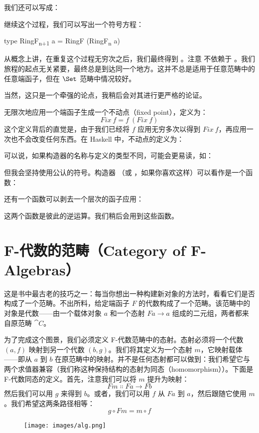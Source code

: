 我们还可以写成：

继续这个过程，我们可以写出一个符号方程：

\begin{snipv}
  type RingF\textsubscript{n+1} a = RingF (RingF\textsubscript{n} a)
\end{snipv}
从概念上讲，在重复这个过程无穷次之后，我们最终得到 。注意  不依赖于 。我们旅程的起点无关紧要，最终总是到达同一个地方。这并不总是适用于任意范畴中的任意端函子，但在 $\Set$ 范畴中情况较好。

当然，这只是一个牵强的论点，我稍后会对其进行更严格的论证。

无限次地应用一个端函子生成一个不动点（fixed point），定义为：
\[\mathit{Fix}\ f = f\ (\mathit{Fix}\ f)\]
这个定义背后的直觉是，由于我们已经将 $f$ 应用无穷多次以得到 $\mathit{Fix}\ f$，再应用一次也不会改变任何东西。在 Haskell 中，不动点的定义为：

可以说，如果构造器的名称与定义的类型不同，可能会更易读，如：

但我会坚持使用公认的符号。构造器 （或 ，如果你喜欢这样）可以看作是一个函数：

还有一个函数可以剥去一个层次的函子应用：

这两个函数是彼此的逆运算。我们稍后会用到这些函数。

\section{F-代数的范畴（Category of F-Algebras）}

这是书中最古老的技巧之一：每当你想出一种构建新对象的方法时，看看它们是否构成了一个范畴。不出所料，给定端函子 $F$ 的代数构成了一个范畴。该范畴中的对象是代数——由一个载体对象 $a$ 和一个态射 $F a \to a$ 组成的二元组，两者都来自原范畴 $\cat{C}$。

为了完成这个图景，我们必须定义 F-代数范畴中的态射。态射必须将一个代数 $(a, f)$ 映射到另一个代数 $(b, g)$。我们将其定义为一个态射 $m$，它映射载体——即从 $a$ 到 $b$ 在原范畴中的映射。并不是任何态射都可以做到：我们希望它与两个求值器兼容（我们称这种保持结构的态射为同态（homomorphism））。下面是 F-代数同态的定义。首先，注意我们可以将 $m$ 提升为映射：
\[F m \Colon F a \to F b\]
然后我们可以用 $g$ 来得到 $b$。或者，我们可以用 $f$ 从 $F a$ 到 $a$，然后跟随它使用 $m$。我们希望这两条路径相等：
\[g \circ F m = m \circ f\]

\begin{figure}[H]
  \centering
  \texttt{[image: images/alg.png]}
\end{figure}

